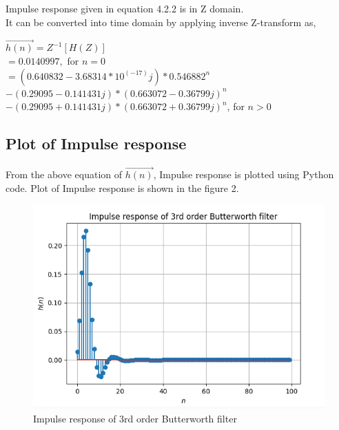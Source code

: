 \documentclass[journal,10pt,twocolumn]{article}
\begin{document}
\begin{flushleft}
Impulse response given in equation 4.2.2 is in Z domain.\\
It can be converted into time domain by applying inverse Z-transform as,\\
\begin{flushleft}
    
$\vec{h(n)} = Z^{-1}[H(Z)]$\\
\vspace{0.2cm}
$= 0.0140997,$ for $n=0 $\\
\vspace{0.2cm}
$= (0.640832 - 3.68314*10^{(-17)}j) * 0.546882^n $\\
 $ -(0.29095 - 0.141431j) * (0.663072 - 0.36799j)^n$ \\
 $ -(0.29095 + 0.141431j) *(0.663072 + 0.36799j)^n$, for $n>0$   
\end{flushleft}

\subsection{Plot of Impulse response}
\vspace{0.2cm}
From the above equation of $\vec{h(n)}$, Impulse response is plotted using Python code. Plot of Impulse response is shown in the figure 2.\\
\begin{figure}[h]
\includegraphics[width=1\columnwidth]{impulse.png}
\caption{Impulse response of 3rd order Butterworth filter}
\label{fig:Impulse response of 3rd order Butterworth filter}
\end{figure}


\end{flushleft}
\end{document}
